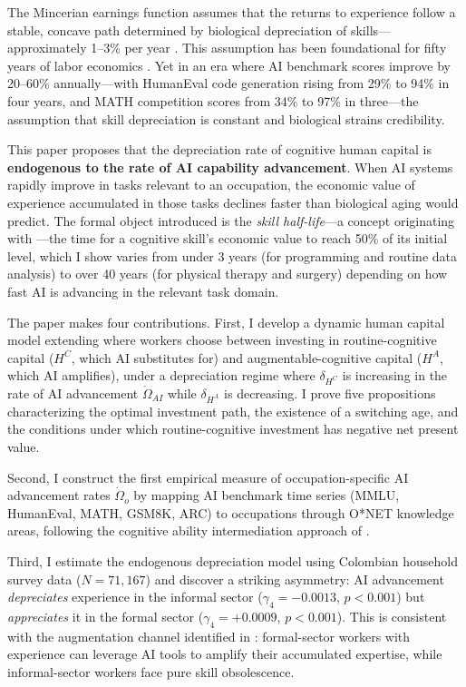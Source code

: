 \documentclass[11pt,a4paper]{article}
\theoremstyle{definition}
\begin{document}
The Mincerian earnings function assumes that the returns to experience follow a stable, concave path determined by biological depreciation of skills---approximately 1--3\% per year \citep{mincer1974schooling, heckman2006earnings}. This assumption has been foundational for fifty years of labor economics \citep{degrip2002obsolescence, weber2014depreciation}. Yet in an era where AI benchmark scores improve by 20--60\% annually---with HumanEval code generation rising from 29\% to 94\% in four years, and MATH competition scores from 34\% to 97\% in three---the assumption that skill depreciation is constant and biological strains credibility.

This paper proposes that the depreciation rate of cognitive human capital is \textbf{endogenous to the rate of AI capability advancement}. When AI systems rapidly improve in tasks relevant to an occupation, the economic value of experience accumulated in those tasks declines faster than biological aging would predict. The formal object introduced is the \textit{skill half-life}---a concept originating with \citet{machlup1962production}---the time for a cognitive skill's economic value to reach 50\% of its initial level, which I show varies from under 3 years (for programming and routine data analysis) to over 40 years (for physical therapy and surgery) depending on how fast AI is advancing in the relevant task domain.

The paper makes four contributions. First, I develop a dynamic human capital model extending \citet{benporath1967production} where workers choose between investing in routine-cognitive capital ($H^C$, which AI substitutes for) and augmentable-cognitive capital ($H^A$, which AI amplifies), under a depreciation regime where $\delta_{H^C}$ is increasing in the rate of AI advancement $\dot{\Omega}_{AI}$ while $\delta_{H^A}$ is decreasing. I prove five propositions characterizing the optimal investment path, the existence of a switching age, and the conditions under which routine-cognitive investment has negative net present value.

Second, I construct the first empirical measure of occupation-specific AI advancement rates $\dot{\Omega}_o$ by mapping AI benchmark time series (MMLU, HumanEval, MATH, GSM8K, ARC) to occupations through O*NET knowledge areas, following the cognitive ability intermediation approach of \citet{tolan2021measuring}.

Third, I estimate the endogenous depreciation model using Colombian household survey data ($N = 71{,}167$) and discover a striking asymmetry: AI advancement \textit{depreciates} experience in the informal sector ($\gamma_4 = -0.0013$, $p < 0.001$) but \textit{appreciates} it in the formal sector ($\gamma_4 = +0.0009$, $p < 0.001$). This is consistent with the augmentation channel identified in \citet{espinal2026ahc}: formal-sector workers with experience can leverage AI tools to amplify their accumulated expertise, while informal-sector workers face pure skill obsolescence.
\end{document}
